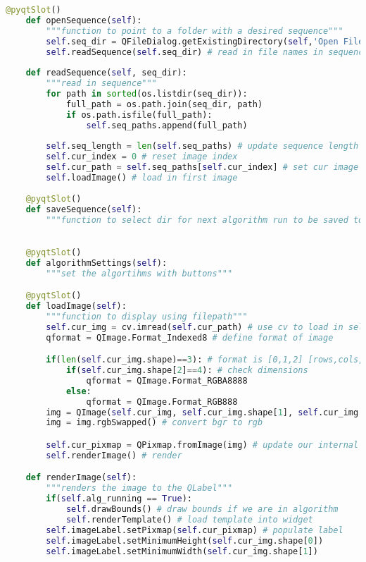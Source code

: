 \begin{lstlisting}[language=Python, caption={GUI Impementation Code}, captionpos=b, label={lst:gui}]
    @pyqtSlot()
    def openSequence(self):
        """function to point to a folder with a desired sequence"""
        self.seq_dir = QFileDialog.getExistingDirectory(self,'Open File') # store path to sequence
        self.readSequence(self.seq_dir) # read in file names in sequence into self.paths
  
    def readSequence(self, seq_dir):
        """read in sequence"""
        for path in sorted(os.listdir(seq_dir)):
            full_path = os.path.join(seq_dir, path)
            if os.path.isfile(full_path):
                self.seq_paths.append(full_path)
        
        self.seq_length = len(self.seq_paths) # update sequence length
        self.cur_index = 0 # reset image index
        self.cur_path = self.seq_paths[self.cur_index] # set cur image to first image in self.seq_paths
        self.loadImage() # load in first image
  
    @pyqtSlot()
    def saveSequence(self):
        """function to select dir for next algorithm run to be saved to"""
        

    @pyqtSlot()
    def algorithmSettings(self):
        """set the algortihms with buttons"""

    @pyqtSlot()
    def loadImage(self):
        """function to display using filepath"""
        self.cur_img = cv.imread(self.cur_path) # use cv to load in self.cur_img
        qformat = QImage.Format_Indexed8 # define format of image

        if(len(self.cur_img.shape)==3): # format is [0,1,2] [rows,cols,components]
            if(self.cur_img.shape[2]==4): # check dimensions
                qformat = QImage.Format_RGBA8888
            else:
                qformat = QImage.Format_RGB888
        img = QImage(self.cur_img, self.cur_img.shape[1], self.cur_img.shape[0], self.cur_img.strides[0], qformat)
        img = img.rgbSwapped() # convert bgr to rgb

        self.cur_pixmap = QPixmap.fromImage(img) # update our internal current pixmap
        self.renderImage() # render

    def renderImage(self):
        """renders the image to the QLabel"""
        if(self.alg_running == True):
            self.drawBounds() # draw bounds if we are in algorithm
            self.renderTemplate() # load template into widget
        self.imageLabel.setPixmap(self.cur_pixmap) # populate label
        self.imageLabel.setMinimumHeight(self.cur_img.shape[0])
        self.imageLabel.setMinimumWidth(self.cur_img.shape[1])
        

\end{lstlisting}
